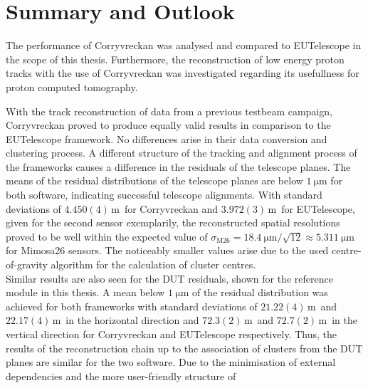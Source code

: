 \chapter{Summary and Outlook}
The performance of Corryvreckan was analysed and compared to EUTelescope in the scope of this thesis. Furthermore, the reconstruction of low energy proton
tracks with the use of Corryvreckan was investigated regarding its usefullness for proton computed tomography.

With the track reconstruction of data from a previous testbeam campaign, Corryvreckan proved to
produce equally valid results in comparison to the EUTelescope framework. No differences
arise in their data conversion and clustering process.
A different structure of the tracking and alignment process of the frameworks causes a difference in the residuals
of the telescope planes. The means of the residual distributions of the telescope planes
are below $\SI{1}{\micro\meter}$ for both software, indicating successful telescope alignments.
With standard deviations of $4.450(4)$\,\textmu m\, for Corryvreckan and $3.972(3)$\,\textmu m\, for EUTelescope, given for the second sensor exemplarily, the
reconstructed spatial resolutions proved to be well within
the expected value of $\sigma_{\text{M26}} = \SI{18.4}{\micro\meter}/\sqrt{12} \approx \SI{5.311}{\micro\meter}$ for Mimosa26 sensors. The noticeably smaller values
arise due to the used centre-of-gravity algorithm for the calculation of cluster centres. \\
Similar results are also seen for the DUT residuals, shown for the reference module in this thesis.
A mean below $\SI{1}{\micro\meter}$ of the residual distribution was achieved for both frameworks with standard deviations of $21.22(4)$\,\textmu m\, and $22.17(4)$\,\textmu m\, in the horizontal direction and
$72.3(2)$\,\textmu m\, and $72.7(2)$\,\textmu m\, in the vertical direction for Corryvreckan and EUTelescope respectively.
Thus, the results of the reconstruction chain up to the
association of clusters from the DUT planes are similar for the two software. Due to the minimisation of external dependencies and the more user-friendly structure of

